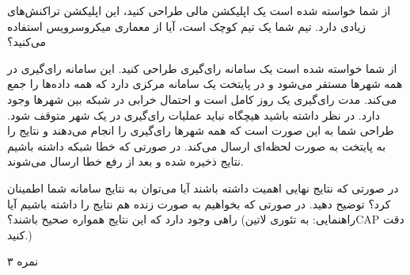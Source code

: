 

از شما خواسته شده است یک اپلیکشن مالی طراحی کنید، این اپلیکشن تراکنش‌های زیادی دارد. تیم شما یک تیم کوچک است، آیا از معماری میکروسرویس استفاده می‌کنید؟


از شما خواسته شده است یک سامانه رای‌گیری طراحی کنید. این سامانه رای‌گیری در همه شهرها مستقر می‌شود و در پایتخت یک سامانه مرکزی دارد که همه داده‌ها را جمع می‌کند. مدت رای‌گیری یک روز کامل است و احتمال خرابی در شبکه بین شهرها وجود دارد. در نظر داشته باشید هیچگاه نباید عملیات رای‌گیری در یک شهر متوقف شود.
طراحی شما به این صورت است که همه شهرها رای‌گیری را انجام می‌دهند و نتایج را به پایتخت به صورت لحظه‌ای ارسال می‌کند. در صورتی که خطا شبکه داشته باشیم نتایج ذخیره شده و بعد از رفع خطا ارسال می‌شوند.

در صورتی که نتایج نهایی اهمیت داشته باشند آیا می‌توان به نتایج سامانه شما اطمینان کرد؟ توضیح دهید. در صورتی که بخواهیم به صورت زنده هم نتایج را داشته باشیم آیا راهی وجود دارد که این نتایج همواره صحیح باشند؟ (راهنمایی: به تئوری ‌لاتین{CAP} دقت کنید.)

۳ نمره

